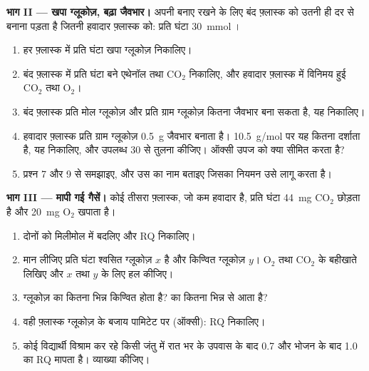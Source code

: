 \begin{problem}
\medskip
\noindent\textbf{भाग II --- खपा ग्लूकोज़, बढ़ा जैवभार।}
अपनी  बनाए रखने के लिए बंद फ़्लास्क को उतनी ही दर से  बनाना
पड़ता है जितनी हवादार फ़्लास्क को: प्रति घंटा \qty{30}{mmol} ।
\begin{enumerate}[resume]
  \item हर फ़्लास्क में प्रति घंटा खपा ग्लूकोज़ निकालिए।
  \item बंद फ़्लास्क में प्रति घंटा बने एथेनॉल तथा $\mathrm{CO_2}$
        निकालिए, और हवादार फ़्लास्क में विनिमय हुई $\mathrm{CO_2}$ तथा
        $\mathrm{O_2}$।
  \item बंद फ़्लास्क प्रति मोल ग्लूकोज़ और प्रति ग्राम ग्लूकोज़ कितना
        जैवभार बना सकता है, यह निकालिए।
  \item हवादार फ़्लास्क प्रति ग्राम ग्लूकोज़ \qty{0.5}{g} जैवभार बनाता
        है। \qty{10.5}{g/mol} पर यह कितना  दर्शाता है, यह निकालिए,
        और उपलब्ध 30  से तुलना कीजिए। ऑक्सी उपज को क्या सीमित करता
        है?
  \item प्रश्न 7 और 9 से  समझाइए, और उस  का नाम
        बताइए जिसका नियमन उसे लागू करता है।
\end{enumerate}

\medskip
\noindent\textbf{भाग III --- मापी गई गैसें।}
कोई तीसरा फ़्लास्क, जो कम हवादार है, प्रति घंटा \qty{44}{mg}
$\mathrm{CO_2}$ छोड़ता है और \qty{20}{mg} $\mathrm{O_2}$ खपाता है।
\begin{enumerate}[resume]
  \item दोनों को मिलीमोल में बदलिए और RQ निकालिए।
  \item मान लीजिए प्रति घंटा श्वसित ग्लूकोज़ $x$ है और किण्वित
        ग्लूकोज़ $y$। $\mathrm{O_2}$ तथा $\mathrm{CO_2}$ के बहीखाते
        लिखिए और $x$ तथा $y$ के लिए हल कीजिए।
  \item ग्लूकोज़ का कितना भिन्न किण्वित होता है?  का कितना भिन्न
         से आता है?
  \item वही फ़्लास्क ग्लूकोज़ के बजाय पामिटेट पर (ऑक्सी):
        RQ निकालिए।
  \item कोई विद्यार्थी विश्राम कर रहे किसी जंतु में रात भर के उपवास के
        बाद 0.7 और भोजन के बाद 1.0 का RQ मापता है। व्याख्या कीजिए।
\end{enumerate}


\end{problem}
